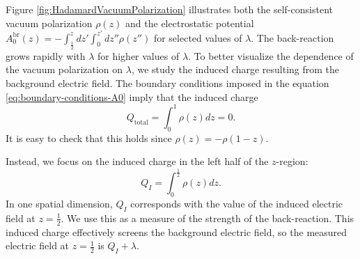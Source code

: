 Figure \ref{fig:HadamardVacuumPolarization} illustrates both the self-consistent vacuum polarization $\rho(z)$ and the electrostatic potential $A_0^\text{br}(z) = -\int_{\frac{1}{2}}^z dz' \int_0^{z'}dz''{\rho}(z'')$ for selected values of $\lambda$. The back-reaction grows rapidly with $\lambda$ for higher values of $\lambda$. 
To better visualize the dependence of the vacuum polarization on $\lambda$, we study the induced charge resulting from the background electric field. The boundary conditions imposed in the equation \eqref{eq:boundary-conditions-A0} imply that the induced charge 
$$Q_{\text{total}} = \int_0^1 \rho(z) dz = 0.$$
It is easy to check that this holds since $\rho(z) = -\rho(1-z)$.

Instead, we focus on the induced charge in the left half of the $z$-region:
$$Q_{I} = \int_0^\frac{1}{2} \rho(z) dz.$$
In one spatial dimension, $Q_I$ corresponds with the value of the induced electric field at $z=\frac{1}{2}$. We use this as a measure of the strength of the back-reaction. This induced charge effectively screens the background electric field, so the measured electric field at $z=\frac{1}{2}$ is $Q_I + \lambda$. 


